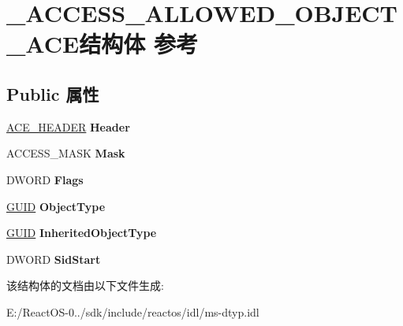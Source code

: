 \hypertarget{struct___a_c_c_e_s_s___a_l_l_o_w_e_d___o_b_j_e_c_t___a_c_e}{}\section{\+\_\+\+A\+C\+C\+E\+S\+S\+\_\+\+A\+L\+L\+O\+W\+E\+D\+\_\+\+O\+B\+J\+E\+C\+T\+\_\+\+A\+C\+E结构体 参考}
\label{struct___a_c_c_e_s_s___a_l_l_o_w_e_d___o_b_j_e_c_t___a_c_e}
\subsection*{Public 属性}
\begin{DoxyCompactItemize}
\item 
\mbox{\label{struct___a_c_c_e_s_s___a_l_l_o_w_e_d___o_b_j_e_c_t___a_c_e_a1335a753fb867c99d5030268886f05e5}} 
\hyperlink{struct___a_c_e___h_e_a_d_e_r}{A\+C\+E\+\_\+\+H\+E\+A\+D\+ER} {\bfseries Header}
\item 
\mbox{\label{struct___a_c_c_e_s_s___a_l_l_o_w_e_d___o_b_j_e_c_t___a_c_e_a1a44c52b0384a42141766c90e679bee3}} 
A\+C\+C\+E\+S\+S\+\_\+\+M\+A\+SK {\bfseries Mask}
\item 
\mbox{\label{struct___a_c_c_e_s_s___a_l_l_o_w_e_d___o_b_j_e_c_t___a_c_e_afba4dc78230c24ee3798db89d6006da5}} 
D\+W\+O\+RD {\bfseries Flags}
\item 
\mbox{\label{struct___a_c_c_e_s_s___a_l_l_o_w_e_d___o_b_j_e_c_t___a_c_e_a2554a4984b15982ef5089fc9a635a4bf}} 
\hyperlink{interface_g_u_i_d}{G\+U\+ID} {\bfseries Object\+Type}
\item 
\mbox{\label{struct___a_c_c_e_s_s___a_l_l_o_w_e_d___o_b_j_e_c_t___a_c_e_a5a0713922504d25b728d80aec76824d0}} 
\hyperlink{interface_g_u_i_d}{G\+U\+ID} {\bfseries Inherited\+Object\+Type}
\item 
\mbox{\label{struct___a_c_c_e_s_s___a_l_l_o_w_e_d___o_b_j_e_c_t___a_c_e_ae682d43ec045096b8ab0992353d10af6}} 
D\+W\+O\+RD {\bfseries Sid\+Start}
\end{DoxyCompactItemize}


该结构体的文档由以下文件生成\+:\begin{DoxyCompactItemize}
\item 
E\+:/\+React\+O\+S-\/0../sdk/include/reactos/idl/ms-\/dtyp.\+idl\end{DoxyCompactItemize}
